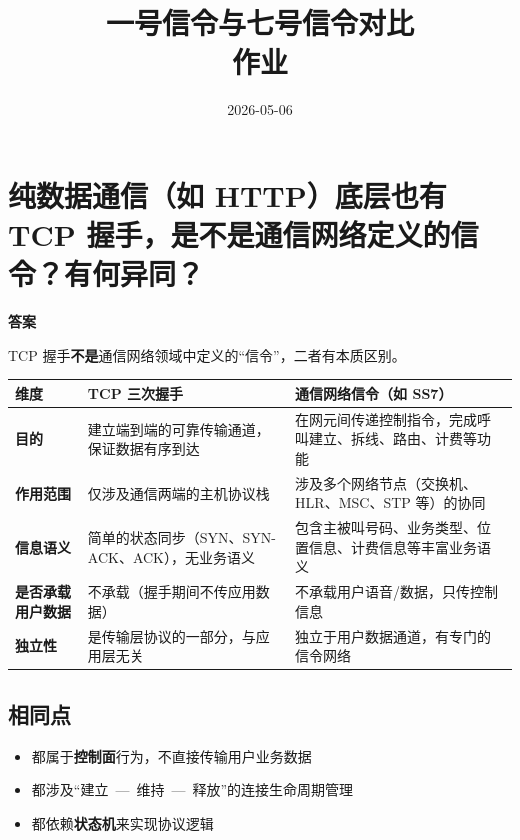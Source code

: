 \documentclass[12pt,a4paper]{ctexart}
\title{\textbf{一号信令与七号信令对比} \\ \large 作业}
\author{}
\date{2026-05-06}
\begin{document}
\pagestyle{plain}

\maketitle

\section{纯数据通信（如 HTTP）底层也有 TCP 握手，是不是通信网络定义的信令？有何异同？}

\textbf{答案}

TCP 握手\textbf{不是}通信网络领域中定义的“信令”，二者有本质区别。

\begin{table}[htbp]
\centering
\scriptsize
\begin{tabular}{>{\bfseries}p{3cm} p{5.5cm} p{5.5cm}}
\toprule
\textbf{维度} & \textbf{TCP 三次握手} & \textbf{通信网络信令（如 SS7）} \\
\midrule
目的 &
建立端到端的可靠传输通道，保证数据有序到达 &
在网元间传递控制指令，完成呼叫建立、拆线、路由、计费等功能 \\
\addlinespace
作用范围 &
仅涉及通信两端的主机协议栈 &
涉及多个网络节点（交换机、HLR、MSC、STP 等）的协同 \\
\addlinespace
信息语义 &
简单的状态同步（SYN、SYN-ACK、ACK），无业务语义 &
包含主被叫号码、业务类型、位置信息、计费信息等丰富业务语义 \\
\addlinespace
是否承载用户数据 &
不承载（握手期间不传应用数据） &
不承载用户语音/数据，只传控制信息 \\
\addlinespace
独立性 &
是传输层协议的一部分，与应用层无关 &
独立于用户数据通道，有专门的信令网络 \\
\bottomrule
\end{tabular}
\end{table}

\subsection*{相同点}
\begin{itemize}
  \item 都属于\textbf{控制面}行为，不直接传输用户业务数据
  \item 都涉及“建立~—~维持~—~释放”的连接生命周期管理
  \item 都依赖\textbf{状态机}来实现协议逻辑
\end{itemize}
\end{document}
